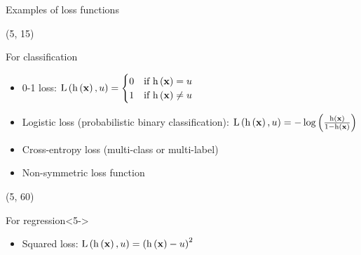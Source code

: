 \begin{frame}{Examples of loss functions}

  \begin{textblock}{90}(5, 15)
    \begin{block}{For classification}
      \begin{itemize}
      \item<2-> 0-1 loss:
        $\mathrm{L} \left ( {\mathrm{h} \left ( {\mathbf{x}} \right ), u} \right ) =
        \begin{cases}
          0 & \text{if $\mathrm{h} \left ( {\mathbf{x}} \right )  =  u$} \\
          1 & \text{if $\mathrm{h} \left ( {\mathbf{x}} \right ) \ne u$}
        \end{cases}
        $
      \item<3-> Logistic loss (probabilistic binary classification): $\mathrm{L} \left ( {\mathrm{h} \left ( {\mathbf{x}} \right ),
          u} \right ) =
        -\log \left ( {\frac{\mathrm{h} \left ( {\mathbf{x}} \right )}{1-\mathrm{h} \left ( {\mathbf{x}} \right )}} \right )$
      \item<3-> Cross-entropy loss (multi-class or multi-label)
      \item<4-> Non-symmetric loss function
      \end{itemize}
    \end{block}
  \end{textblock}

  \begin{textblock}{90}(5, 60)
    \begin{block}{For regression}<5->
      \begin{itemize}
      \item<5-> Squared loss: $\mathrm{L} \left ( {\mathrm{h} \left ( {\mathbf{x}} \right ), u} \right )
        = \left( \mathrm{h} \left ( {\mathbf{x}} \right ) - u \right)^2$
      \end{itemize}
    \end{block}
  \end{textblock}
\end{frame}


